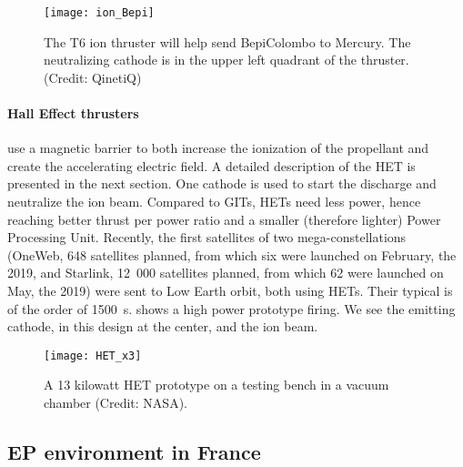 \begin{figure}[!hbt]
  \centering
  \texttt{[image: ion\_Bepi]}
  \caption{The T6 ion thruster will help send BepiColombo to Mercury. The neutralizing cathode is in the upper left quadrant of the thruster. (Credit\string: QinetiQ)}
  \label{fig-iongridded}
\end{figure}
 
 \paragraph{Hall Effect thrusters} use a magnetic barrier to both increase the ionization of the propellant and create the accelerating electric field.
 A detailed description of the \ac{HET} is presented in the next section.
 One cathode is used to start the discharge and neutralize the ion beam.
 Compared to GITs, \ac{HET}s need less power, hence reaching better thrust per power ratio and a smaller (therefore lighter) Power Processing Unit.
 Recently, the first satellites of two mega-constellations (OneWeb, 648 satellites planned, from which six were launched on February, the  2019, and Starlink, 12~000 satellites planned, from which 62 were launched on May, the  2019) were sent to Low Earth orbit, both using \ac{HET}s. 
 Their typical \Isp is of the order of 1500~s.
  shows a high power prototype firing.
 We see the emitting cathode, in this design at the center, and the ion beam.
 \begin{figure}[!hbt]
   \centering
   \texttt{[image: HET\_x3]}
   \caption{A 13 kilowatt \acs{HET} prototype on a testing bench in a vacuum chamber (Credit\string: NASA).  }
   \label{fig-13kWHET}
 \end{figure}
 
 
 \subsection{EP environment in France} \label{subsec-HET_thruster}
 
